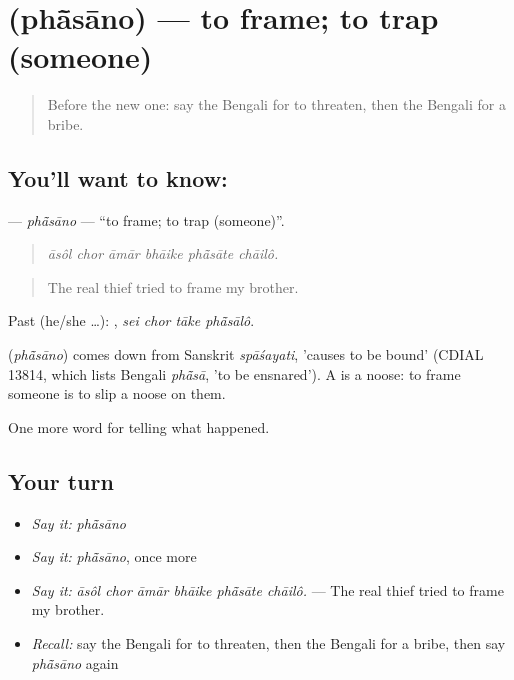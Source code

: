 \section[\texorpdfstring{\bn{ফাঁসানো} (phā̃sāno)}{ফাঁসানো (phā̃sāno)}]{ (phā̃sāno) — to frame; to trap (someone)}

\label{lesson:BN-C285-phasano}



\begin{quote}
Before the new one: say the Bengali for to threaten, then the Bengali for a bribe.
\end{quote}

\subsection*{You'll want to know: }
\textbf{} — \emph{phā̃sāno} — \textquotedblleft{}to frame; to trap (someone)\textquotedblright{}.

\begin{quote}
     
\end{quote}

\begin{quote}
\emph{āsôl chor āmār bhāike phā̃sāte chāilô.}
\end{quote}

\begin{quote}
The real thief tried to frame my brother.
\end{quote}

Past (he/she …):    , \emph{sei chor tāke phā̃sālô}.

\begin{cousinweb}
\textbf{} (\emph{phā̃sāno}) comes down from Sanskrit \emph{spāśayati}, 'causes to be bound' (CDIAL 13814, which lists Bengali \emph{phā̃sā}, 'to be ensnared'). A  is a noose: to frame someone is to slip a noose on them.
\end{cousinweb}

\begin{grammarlens}[title={What you've built}]
One more word for telling what happened.
\end{grammarlens}

\subsection*{Your turn}
\begin{itemize}
\raggedright
  \item \emph{Say it:} \emph{phā̃sāno}
  \item \emph{Say it:} \emph{phā̃sāno}, once more
  \item \emph{Say it:} \emph{āsôl chor āmār bhāike phā̃sāte chāilô.} — The real thief tried to frame my brother.
  \item \emph{Recall:} say the Bengali for to threaten, then the Bengali for a bribe, then say \emph{phā̃sāno} again
\end{itemize}

